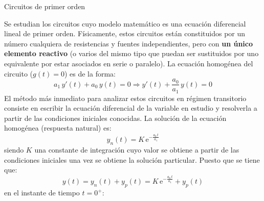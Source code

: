 \documentclass[11pt]{book} %
\makeatletter
\numberwithin{dummy}{section}
\theoremstyle{ocrenumbox}
\theoremstyle{blacknumex}
\theoremstyle{blacknumbox}
\theoremstyle{ocrenum}
\renewcommand{\section}{\@startsection{section}{1}{\z@}
{-4ex \@plus -1ex \@minus -.4ex}
{1ex \@plus.2ex }
{\normalfont\large\sffamily\bfseries}}
\newlength\esp
\makeatother
\begin{document}
	
	
	\section{Circuitos de primer orden}
	
	Se estudian los circuitos cuyo modelo matemático es una ecuación diferencial lineal de primer orden. Físicamente, estos circuitos están constituidos por un número cualquiera de resistencias y fuentes independientes, pero con \textbf{un único elemento reactivo} (o varios del mismo tipo que puedan ser sustituidos por uno equivalente por estar asociados en serie o paralelo). La ecuación homogénea del circuito ($g(t)=0$) es de la forma:
	\begin{equation*}
	    a_1\,y'(t)+a_0\,y(t)=0\Rightarrow y'(t)+\dfrac{a_0}{a_1}\,y(t)=0
	\end{equation*}
 	El método más inmediato para analizar estos circuitos en régimen transitorio consiste en escribir la ecuación diferencial de la variable en estudio y resolverla a partir de las condiciones iniciales conocidas. %
	La solución de la ecuación homogénea ({respuesta natural}) es: 
	\begin{equation}\label{eq.respuesta_natural_1}
	   \boxed{y_n(t)=K\,\mathrm{e}^{-\frac{a_0\,t}{a_1}}}
	\end{equation}
	siendo $K$ una constante de integración cuyo valor se obtiene a partir de las condiciones iniciales una vez se obtiene la solución particular. Puesto que se tiene que:
	\begin{equation*}
	    y(t)=y_n(t)+y_p(t)=K\,\mathrm{e}^{-\frac{a_0\,t}{a_1}}+y_p(t)
	\end{equation*}
	en el instante de tiempo $t=0^+$: 
\end{document}
